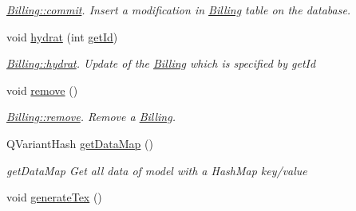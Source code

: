 \begin{DoxyCompactItemize}
\begin{DoxyCompactList}\small\item\em \hyperlink{classModels_1_1Billing_ad2280a0d8dde4c36e88c344b01044caf}{Billing\-::commit}. Insert a modification in \hyperlink{classModels_1_1Billing}{Billing} table on the database. \end{DoxyCompactList}\item 
void \hyperlink{classModels_1_1Billing_a689643008955fdcd5833631a6202c0dc}{hydrat} (int \hyperlink{classModels_1_1IModel_a63087bb34da8c38a11109cd775122d31}{get\-Id})
\begin{DoxyCompactList}\small\item\em \hyperlink{classModels_1_1Billing_a689643008955fdcd5833631a6202c0dc}{Billing\-::hydrat}. Update of the \hyperlink{classModels_1_1Billing}{Billing} which is specified by {\itshape get\-Id} \end{DoxyCompactList}\item 
\hypertarget{classModels_1_1Billing_ada8a7c127a80fa7349fbd6a7d30ca4a3}{void \hyperlink{classModels_1_1Billing_ada8a7c127a80fa7349fbd6a7d30ca4a3}{remove} ()}\label{classModels_1_1Billing_ada8a7c127a80fa7349fbd6a7d30ca4a3}

\begin{DoxyCompactList}\small\item\em \hyperlink{classModels_1_1Billing_ada8a7c127a80fa7349fbd6a7d30ca4a3}{Billing\-::remove}. Remove a \hyperlink{classModels_1_1Billing}{Billing}. \end{DoxyCompactList}\item 
Q\-Variant\-Hash \hyperlink{classModels_1_1Billing_a2363c0b978434c0a835f894a67eb81e1}{get\-Data\-Map} ()
\begin{DoxyCompactList}\small\item\em get\-Data\-Map Get all data of model with a Hash\-Map key/value \end{DoxyCompactList}\item 
\hypertarget{classModels_1_1Billing_a3f835c6f4ea0b66c43bb7fec40c6e075}{void \hyperlink{classModels_1_1Billing_a3f835c6f4ea0b66c43bb7fec40c6e075}{generate\-Tex} ()}\label{classModels_1_1Billing_a3f835c6f4ea0b66c43bb7fec40c6e075}


\end{DoxyCompactItemize}

